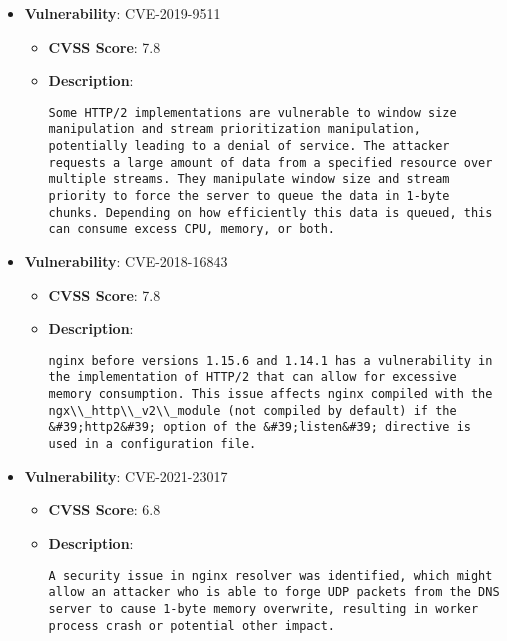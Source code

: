 \documentclass{article}
\begin{document}
\begin{itemize}
        \item \textbf{Vulnerability}: CVE-2019-9511
        \begin{itemize}
            \item \textbf{CVSS Score}:  7.8 
            \item \textbf{Description}:
            \parbox[t]{0.9\linewidth}{
                \verb|Some HTTP/2 implementations are vulnerable to window size manipulation and stream prioritization manipulation, potentially leading to a denial of service. The attacker requests a large amount of data from a specified resource over multiple streams. They manipulate window size and stream priority to force the server to queue the data in 1-byte chunks. Depending on how efficiently this data is queued, this can consume excess CPU, memory, or both.|
            }
        \end{itemize}
    
        \item \textbf{Vulnerability}: CVE-2018-16843
        \begin{itemize}
            \item \textbf{CVSS Score}:  7.8 
            \item \textbf{Description}:
            \parbox[t]{0.9\linewidth}{
                \verb|nginx before versions 1.15.6 and 1.14.1 has a vulnerability in the implementation of HTTP/2 that can allow for excessive memory consumption. This issue affects nginx compiled with the ngx\\_http\\_v2\\_module (not compiled by default) if the &#39;http2&#39; option of the &#39;listen&#39; directive is used in a configuration file.|
            }
        \end{itemize}
    
        \item \textbf{Vulnerability}: CVE-2021-23017
        \begin{itemize}
            \item \textbf{CVSS Score}:  6.8 
            \item \textbf{Description}:
            \parbox[t]{0.9\linewidth}{
                \verb|A security issue in nginx resolver was identified, which might allow an attacker who is able to forge UDP packets from the DNS server to cause 1-byte memory overwrite, resulting in worker process crash or potential other impact.|
            }
        \end{itemize}
    

\end{itemize}
\end{document}
